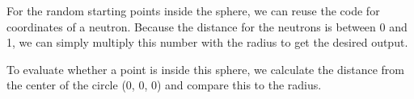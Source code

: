For the random starting points inside the sphere, we can reuse the code for coordinates of a neutron. Because the distance for the neutrons is between 0 and 1, we can simply multiply this number with the radius to get the desired output.

To evaluate whether a point is inside this sphere, we calculate the distance from the center of the circle (0, 0, 0) and compare this to the radius.